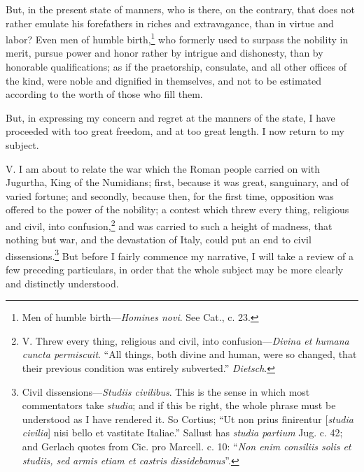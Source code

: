 But, in the present state of manners, who is there, on the contrary,
that does not rather emulate his forefathers in riches and extravagance,
than in virtue and labor? Even men of humble birth,\footnote{Men of humble birth—\emph{Homines novi}. See Cat., c. 23.} who formerly
used to surpass the nobility in merit, pursue power and honor rather
by intrigue and dishonesty, than by honorable qualifications; as if
the praetorship, consulate, and all other offices of the kind, were
noble and dignified in themselves, and not to be estimated according
to the worth of those who fill them.

But, in expressing my concern and regret at the manners of the state,
I have proceeded with too great freedom, and at too great length. I
now return to my subject.

V. I am about to relate the war which the Roman people carried on with
Jugurtha, King of the Numidians; first, because it was great, sanguinary,
and of varied fortune; and secondly, because then, for the first time,
opposition was offered to the power of the nobility; a contest which
threw every thing, religious and civil, into confusion,\footnote{V. Threw every thing, religious and civil, into confusion—\emph{Divina
et humana cuncta permiscuit}. ``All things, both divine and human, were
so changed, that their previous condition was entirely subverted.''
\emph{Dietsch}.} and was
carried to such a height of madness, that nothing but war, and the
devastation of Italy, could put an end to civil dissensions.\footnote{Civil dissensions—\emph{Studiis civilibus}. This is the sense in
which most commentators take \emph{studia}; and if this be right, the whole
phrase must be understood as I have rendered it. So Cortius; ``Ut non
prius finirentur [\emph{studia civilia}] nisi bello et vastitate Italiae.''
Sallust has \emph{studia partium} Jug. c. 42; and Gerlach quotes from Cic.
pro Marcell. c. 10: ``\emph{Non enim consiliis solis et studiis, sed armis
etiam et castris dissidebamus}''.} But
before I fairly commence my narrative, I will take a review of a few
preceding particulars, in order that the whole subject may be more
clearly and distinctly understood.

